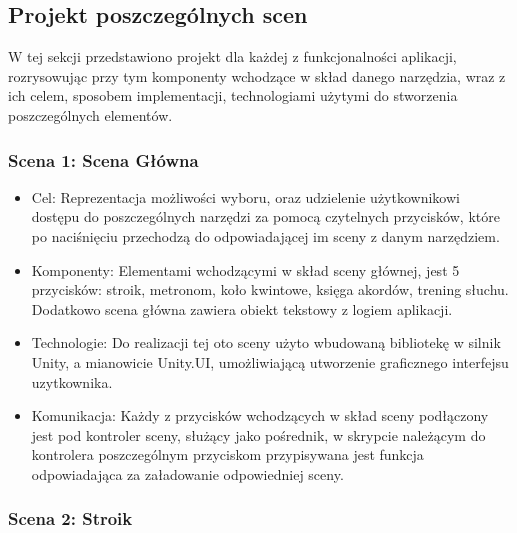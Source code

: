 \subsection{Projekt poszczególnych scen}

W tej sekcji przedstawiono projekt dla każdej z funkcjonalności aplikacji, rozrysowując przy tym komponenty wchodzące w skład danego narzędzia, wraz z ich celem, sposobem implementacji, technologiami użytymi do stworzenia poszczególnych elementów. 

\subsubsection{Scena 1: Scena Główna}

\begin{itemize}

\item Cel: Reprezentacja możliwości wyboru, oraz udzielenie użytkownikowi dostępu do poszczególnych narzędzi za pomocą czytelnych przycisków, które po naciśnięciu przechodzą do odpowiadającej im sceny z danym narzędziem. 
\item Komponenty: Elementami wchodzącymi w skład sceny głównej, jest 5 przycisków: stroik, metronom, koło kwintowe, księga akordów, trening słuchu. Dodatkowo scena główna zawiera obiekt tekstowy z logiem aplikacji.  
\item Technologie: Do realizacji tej oto sceny użyto wbudowaną bibliotekę w silnik Unity, a mianowicie Unity.UI, umożliwiającą utworzenie graficznego interfejsu uzytkownika. 
\item Komunikacja: Każdy z przycisków wchodzących w skład sceny podłączony jest pod kontroler sceny, służący jako pośrednik, w skrypcie należącym do kontrolera poszczególnym przyciskom przypisywana jest funkcja odpowiadająca za załadowanie odpowiedniej sceny. 
\end{itemize}

\subsubsection{Scena 2: Stroik}

